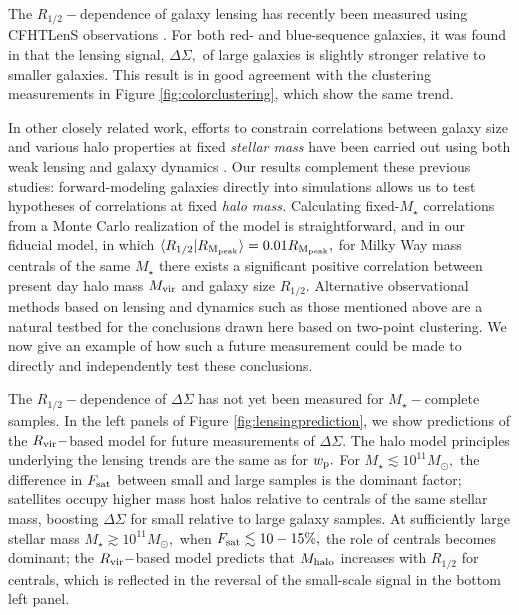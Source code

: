 \documentclass[usenatbib,usegraphicx,letterpaper]{mn2e}
\newcommand{\rhalf}{R_{1/2}}
\newcommand{\mstar}{M_{\star}}
\newcommand{\mvir}{M_{\rm vir}}
\newcommand{\mhalo}{M_{\rm halo}}
\newcommand{\rvir}{R_{\rm vir}}
\newcommand{\rmpeak}{R_{\rm M_{peak}}}
\newcommand{\wproj}{w_{\rm p}}
\newcommand{\mean}[2]{\langle{#1}\vert{#2}\rangle}
\newcommand{\msun}{M_\odot}
\begin{document}
The $\rhalf-$dependence of galaxy lensing has recently been measured using CFHTLenS observations \citep{heymans_etal12,erben_etal13}. For both red- and blue-sequence galaxies, it was found in \citet{charlton_etal17} that the lensing signal, $\Delta\Sigma,$ of large galaxies is slightly stronger relative to smaller galaxies. This result is in good agreement with the clustering measurements in Figure \ref{fig:colorclustering}, which show the same trend.

In other closely related work, efforts to constrain correlations between galaxy size and various halo properties at fixed {\em stellar mass} have been carried out using both weak lensing \citep[e.g.,][]{sonnenfeld_leauthaud18} and galaxy dynamics \citep[e.g.,][]{desmond_wechsler15,desmond_wechsler17}. Our results complement these previous studies: forward-modeling galaxies directly into simulations allows us to test hypotheses of correlations at fixed {\em halo mass.} Calculating fixed-$\mstar$ correlations from a Monte Carlo realization of the model is straightforward, and in our fiducial model, in which $\mean{\rhalf}{\rmpeak}=0.01\rmpeak,$ for Milky Way mass centrals of the same $\mstar$ there exists a significant positive correlation between present day halo mass $\mvir$ and galaxy size $\rhalf.$ Alternative observational methods based on lensing and dynamics such as those mentioned above are a natural testbed for the conclusions drawn here based on two-point clustering. We now give an example of how such a future measurement could be made to directly and independently test these conclusions.

The $\rhalf-$dependence of $\Delta\Sigma$ has not yet been measured for $\mstar-$complete samples. In the left panels of Figure \ref{fig:lensingprediction}, we show predictions of the $\rvir-$based model for future measurements of $\Delta\Sigma.$ The halo model principles underlying the lensing trends are the same as for $\wproj.$ For $\mstar\lesssim10^{11}\msun,$ the difference in $F_{\rm sat}$ between small and large samples is the dominant factor; satellites occupy higher mass host halos relative to centrals of the same stellar mass, boosting $\Delta\Sigma$ for small relative to large galaxy samples. At sufficiently large stellar mass $\mstar\gtrsim10^{11}\msun,$ when $F_{\rm sat}\lesssim10-15\%,$ the role of centrals becomes dominant; the $\rvir-$based model predicts that $\mhalo$ increases with $\rhalf$ for centrals, which is reflected in the reversal of the small-scale signal in the bottom left panel.
\end{document}
